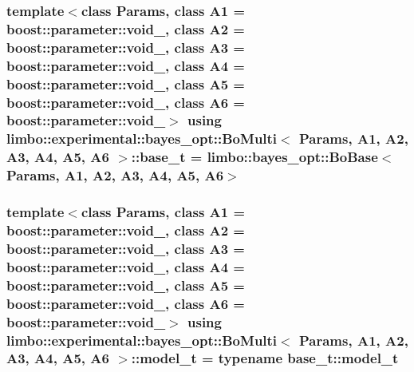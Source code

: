 \subsubsection[{base\+\_\+t}]{\setlength{\rightskip}{0pt plus 5cm}template$<$class Params, class A1 = boost\+::parameter\+::void\+\_\+, class A2 = boost\+::parameter\+::void\+\_\+, class A3 = boost\+::parameter\+::void\+\_\+, class A4 = boost\+::parameter\+::void\+\_\+, class A5 = boost\+::parameter\+::void\+\_\+, class A6 = boost\+::parameter\+::void\+\_\+$>$ using {\bf limbo\+::experimental\+::bayes\+\_\+opt\+::\+Bo\+Multi}$<$ Params, A1, A2, A3, A4, A5, A6 $>$\+::{\bf base\+\_\+t} =  {\bf limbo\+::bayes\+\_\+opt\+::\+Bo\+Base}$<$Params, A1, A2, A3, A4, A5, A6$>$}\label{classlimbo_1_1experimental_1_1bayes__opt_1_1_bo_multi_a96e3df5190731faf8d60b20d6810ba64}
\hypertarget{classlimbo_1_1experimental_1_1bayes__opt_1_1_bo_multi_abc4fa6ff00e1bf591283e5a2739fb6c8}{}
\subsubsection[{model\+\_\+t}]{\setlength{\rightskip}{0pt plus 5cm}template$<$class Params, class A1 = boost\+::parameter\+::void\+\_\+, class A2 = boost\+::parameter\+::void\+\_\+, class A3 = boost\+::parameter\+::void\+\_\+, class A4 = boost\+::parameter\+::void\+\_\+, class A5 = boost\+::parameter\+::void\+\_\+, class A6 = boost\+::parameter\+::void\+\_\+$>$ using {\bf limbo\+::experimental\+::bayes\+\_\+opt\+::\+Bo\+Multi}$<$ Params, A1, A2, A3, A4, A5, A6 $>$\+::{\bf model\+\_\+t} =  typename {\bf base\+\_\+t\+::model\+\_\+t}}\label{classlimbo_1_1experimental_1_1bayes__opt_1_1_bo_multi_abc4fa6ff00e1bf591283e5a2739fb6c8}
\hypertarget{classlimbo_1_1experimental_1_1bayes__opt_1_1_bo_multi_a5592d2f8141fec88904c0f60beb7ff2d}{}
